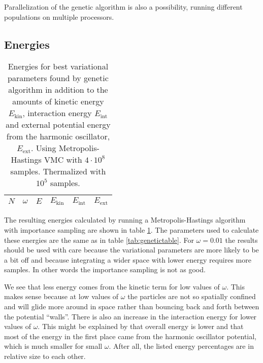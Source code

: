 \documentclass[aps,prb,twocolumn,floatfix]{revtex4}
\begin{document}
Parallelization of the genetic algorithm is also a possibility, running different populations on multiple processors.

\subsection{Energies}

\begin{table}
\centering
\begin{tabular}{c c c c c c}
    \hline
    \hline
    $N$ & $\omega$ & $E$ & $E_{\text{kin}}$ & $E_{\text{int}}$ & $E_{\text{ext}}$ \\
    \hline
    
    
    
    
    \hline
    
    
    
    
    \hline
    
    
    
    
    \hline
\end{tabular}
\caption{Energies for best variational parameters found by genetic algorithm in addition to the amounts of kinetic energy $E_{\text{kin}}$, interaction energy $E_{\text{int}}$ and external potential energy from the harmonic oscillator, $E_{\text{ext}}$. Using Metropolis-Hastings VMC with $4\cdot 10^8$ samples. Thermalized with $10^5$ samples.}
\label{tab:energytable}
\end{table}

The resulting energies calculated by running a Metropolis-Hastings algorithm with importance sampling are shown in table \ref{tab:energytable}. The parameters used to calculate these energies are the same as in table \ref{tab:genetictable}. For $\omega = 0.01$ the results should be used with care because the variational parameters are more likely to be a bit off and because integrating a wider space with lower energy requires more samples. In other words the importance sampling is not as good.

We see that less energy comes from the kinetic term for low values of $\omega$. This makes sense because at low values of $\omega$ the particles are not so spatially confined and will glide more around in space rather than bouncing back and forth between the potential ``walls''. There is also an increase in the interaction energy for lower values of $\omega$. This might be explained by that overall energy is lower and that most of the energy in the first place came from the harmonic oscillator potential, which is much smaller for small $\omega$. After all, the listed energy percentages are in relative size to each other.
\end{document}
